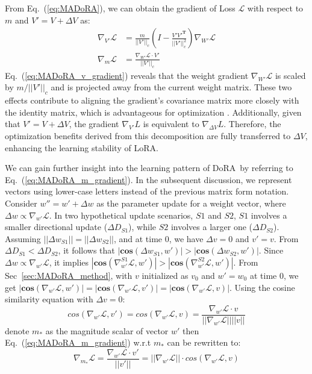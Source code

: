 \documentclass{article}
\newcommand{\ours}{DoRA}
\theoremstyle{plain}
\theoremstyle{definition}
\theoremstyle{remark}
\begin{document}
From Eq.~(\ref{eq:MADoRA}), we can obtain the gradient of Loss $\mathcal{L}$ with respect to $m$ and $V' = V+\Delta V$ as:
\begin{align}
\label{eq:MADoRA_v_gradient}
\nabla_{V'} \mathcal{L} &= \frac{m}{||V'||_{c}}\left( I - \frac{V'V'^{\mathbf{T}}}{||V'||_{c}^2}  \right) \nabla_{W'} \mathcal{L} \\
\label{eq:MADoRA_m_gradient}
\nabla_m \mathcal{L} &=\frac{\nabla_{W'} \mathcal{L} \cdot V'}{||V'||_{c}}
\end{align}
Eq.~(\ref{eq:MADoRA_v_gradient}) reveals that the weight gradient $\nabla_{W'} \mathcal{L}$ is scaled by $m/||V'||_{c}$ and is projected away from the current weight matrix. These two effects contribute to aligning the gradient's covariance matrix more closely with the identity matrix, which is advantageous for optimization \cite{salimans2016weight}. Additionally, given that $V' = V + \Delta V$, the gradient $\nabla_{V'} L$ is equivalent to $\nabla_{\Delta V} L$. Therefore, the optimization benefits derived from this decomposition are fully transferred to $\Delta V$, enhancing the learning stability of LoRA.

We can gain further insight into the learning pattern of \ours~by referring to Eq.~(\ref{eq:MADoRA_m_gradient}). In the subsequent discussion, we represent vectors using lower-case letters instead of the previous matrix form notation. Consider $w'' = w' + \Delta w$ as the parameter update for a weight vector, where $\Delta w \propto \nabla_{w'} \mathcal{L}$. In two hypothetical update scenarios, $S1$ and $S2$, $S1$ involves a smaller directional update ($\Delta D_{S1}$), while $S2$ involves a larger one ($\Delta D_{S2}$). Assuming $||\Delta w_{S1}|| = ||\Delta w_{S2}||$, and at time 0, we have $\Delta v = 0$ and $v' = v$. From $\Delta D_{S1} < \Delta D_{S2}$, it follows that $|\mathbf{cos}(\Delta w_{S1}, w')| > |\mathbf{cos}(\Delta w_{S2}, w')|$. Since $\Delta w \propto \nabla_{w'} \mathcal{L}$, it implies $|\mathbf{cos}(\nabla_{w'}^{S1} \mathcal{L}, w')| > |\mathbf{cos}(\nabla_{w'}^{S2} \mathcal{L}, w')|$. From Sec~\ref{sec:MADoRA_method}, with $v$ initialized as $v_0$ and $w' = w_0$ at time 0, we get $|\mathbf{cos}(\nabla_{w'} \mathcal{L}, w')| = |\mathbf{cos}(\nabla_{w'} \mathcal{L}, v')| = |\mathbf{cos}(\nabla_{w'} \mathcal{L}, v)|$. Using the cosine similarity equation with $\Delta v = 0$:
\begin{equation}
cos(\nabla_{w'} \mathcal{L}, v') = cos(\nabla_{w'} \mathcal{L}, v) =  \frac{\nabla_{w'} \mathcal{L} \cdot v}{||\nabla_{w'} \mathcal{L}||||v||}
\end{equation}
denote $m_{*}$ as the magnitude scalar of vector $w'$
then Eq.~(\ref{eq:MADoRA_m_gradient}) w.r.t $m_{*}$ can be rewritten to:
\begin{equation}
\nabla_{m_{*}} \mathcal{L} = \frac{\nabla_{w'} \mathcal{L} \cdot v'}{||v'||} = ||\nabla_{w'} \mathcal{L}|| \cdot cos(\nabla_{w'} \mathcal{L}, v)
\end{equation}
\end{document}
